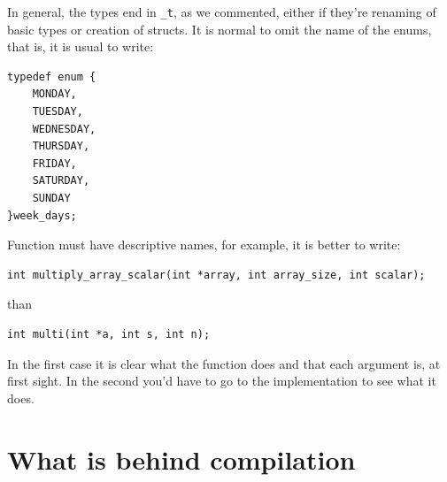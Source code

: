 \documentclass[a4paper]{article}
\begin{document}
In general, the types end in \verb!_t!, as we commented, either if they're
renaming of basic types or creation of structs. It is normal to omit the name
of the enums, that is, it is usual to write:

\noindent
\begin{minipage}[H]{\linewidth}
\mbox{}
\begin{lstlisting}[style=C,
caption={Example of a enum with typedef},
label={lst:typedefEnum}]
typedef enum {
    MONDAY,
    TUESDAY,
    WEDNESDAY,
    THURSDAY,
    FRIDAY,
    SATURDAY,
    SUNDAY
}week_days;
\end{lstlisting}
\end{minipage}

Function must have descriptive names, for example, it is better to write:

\noindent
\begin{minipage}[H]{\linewidth}
\mbox{}
\begin{lstlisting}[style=C,
caption={Example of descriptive function},
label={lst:descriptiveFunction}]
int multiply_array_scalar(int *array, int array_size, int scalar);
\end{lstlisting}
\end{minipage}

than

\noindent
\begin{minipage}[H]{\linewidth}
\mbox{}
\begin{lstlisting}[style=C,
caption={Example of non-descriptive function},
label={lst:nonDescriptiveFunction}]
int multi(int *a, int s, int n);
\end{lstlisting}
\end{minipage}

In the first case it is clear what the function does and that each argument is,
at first sight. In the second you'd have to go to the implementation to see what
it does.

\section{What is behind compilation}
\end{document}
